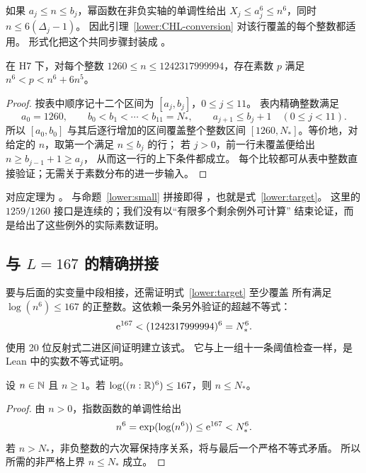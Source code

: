 如果 $a_j\leq n\leq b_j$，幂函数在非负实轴的单调性给出
$X_j\leq a_j^6\leq n^6$，同时 $n\leq6(\Delta_j-1)$。
因此引理~\ref{lower:CHL-conversion} 对该行覆盖的每个整数都适用。
形式化把这个共同步骤封装成
。

\begin{proposition}\label{lower:CHL-coverage}
在 H7 下，对每个整数
$1260\leq n\leq1242317999994$，存在素数 $p$ 满足
$n^6<p<n^6+6n^5$。
\end{proposition}

\begin{proof}
按表中顺序记十二个区间为 $[a_j,b_j]$，$0\leq j\leq11$。
表内精确整数满足
\[
 a_0=1260,\qquad b_0<b_1<\cdots<b_{11}=N_*,
 \qquad a_{j+1}\leq b_j+1\quad(0\leq j<11).
\]
所以 $[a_0,b_0]$ 与其后逐行增加的区间覆盖整个整数区间
$[1260,N_*]$。等价地，对给定的 $n$，取第一个满足 $n\leq b_j$ 的行；
若 $j>0$，前一行未覆盖便给出 $n\geq b_{j-1}+1\geq a_j$，
从而这一行的上下条件都成立。
每个比较都可从表中整数直接验证；无需关于素数分布的进一步输入。
\end{proof}

对应定理为 。
与命题~\ref{lower:small} 拼接即得
，也就是式~\eqref{lower:target}。
这里的 $1259/1260$ 接口是连续的；我们没有以“有限多个剩余例外可计算”
结束论证，而是给出了这些例外的实际素数证明。

\subsection{与 \texorpdfstring{$L=167$}{L=167} 的精确拼接}

要与后面的实变量中段相接，还需证明式~\eqref{lower:target} 至少覆盖
所有满足 $\log(n^6)\leq167$ 的正整数。这依赖一条另外验证的超越不等式：
\begin{equation}\label{lower:join-exp}
 \mathrm e^{167}<(1242317999994)^6=N_*^6.
\end{equation}
 使用 20 位反射式二进区间证明建立该式。
它与上一组十一条阈值检查一样，是 Lean 中的实数不等式证明。

\begin{lemma}[指数接口]\label{lower:log-join}
设 $n\in\mathbb N$ 且 $n\geq1$。若 $\log((n:\mathbb R)^6)\leq167$，则 $n\leq N_*$。
\end{lemma}

\begin{proof}
由 $n>0$，指数函数的单调性给出
\[
 n^6=\exp(\log(n^6))\leq\mathrm e^{167}<N_*^6.
\]
若 $n>N_*$，非负整数的六次幂保持序关系，将与最后一个严格不等式矛盾。
所以所需的非严格上界 $n\leq N_*$ 成立。
\end{proof}

